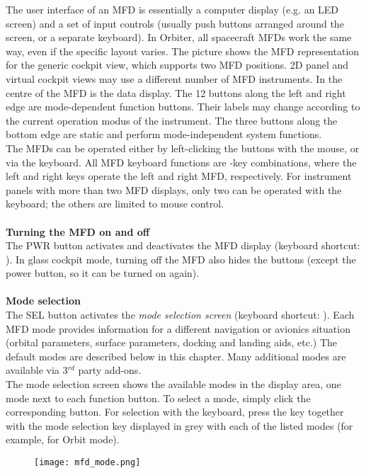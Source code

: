 \documentclass[Orbiter User Manual.tex]{subfiles}
\begin{document}
\noindent
The user interface of an MFD is essentially a computer display (e.g. an LED screen) and a set of input controls (usually push buttons arranged around the screen, or a separate keyboard). In Orbiter, all spacecraft MFDs work the same way, even if the specific layout varies. The picture shows the MFD representation for the generic cockpit view, which supports two MFD positions. 2D panel and virtual cockpit views may use a different number of MFD instruments.
In the centre of the MFD is the data display. The 12 buttons along the left and right edge are mode-dependent function buttons. Their labels may change according to the current operation modus of the instrument. The three buttons along the bottom edge are static and perform mode-independent system functions.\\
The MFDs can be operated either by left-clicking the buttons with the mouse, or via the keyboard. All MFD keyboard functions are \Shift-key combinations, where the left and right \Shift keys operate the left and right MFD, respectively. For instrument panels with more than two MFD displays, only two can be operated with the keyboard; the others are limited to mouse control.\\
\\
\textbf{Turning the MFD on and off}\\
The PWR button activates and deactivates the MFD display (keyboard shortcut: \Shift{}). In glass cockpit mode, turning off the MFD also hides the buttons (except the power button, so it can be turned on again).\\
\\
\textbf{Mode selection}\\
The SEL button activates the \textit{mode selection screen} (keyboard shortcut: \Ctrl{}). Each MFD mode provides information for a different navigation or avionics situation (orbital parameters, surface parameters, docking and landing aids, etc.) The default modes are described below in this chapter. Many additional modes are available via 3$^{rd}$ party add-ons.\\
The mode selection screen shows the available modes in the display area, one mode next to each function button. To select a mode, simply click the corresponding button. For selection with the keyboard, press the \Ctrl key together with the mode selection key displayed in grey with each of the listed modes (for example, \Ctrl{} for Orbit mode).

\begin{figure}[H]
  \centering
  \texttt{[image: mfd\_mode.png]}
\end{figure}
\end{document}
